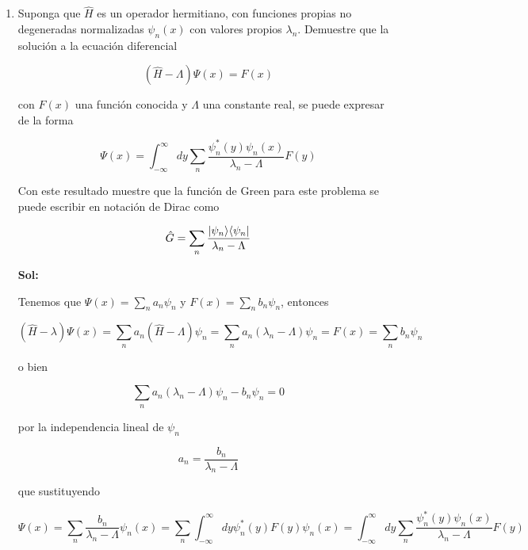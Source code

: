 \documentclass[12pt,a4paper]{article}
\DeclarePairedDelimiter\bra{\langle}{\rvert}
\DeclarePairedDelimiter\ket{\lvert}{\rangle}
\begin{document}
\begin{enumerate}



\item Suponga que $\hat{H}$ es un operador hermitiano, con funciones propias no degeneradas normalizadas $\psi_{n}(x)$ con valores propios $\lambda_n$. Demuestre que la solución a la ecuación diferencial

\begin{equation*}
    (\hat{H} - \Lambda) \Psi (x) = F(x)
\end{equation*}

con $F(x)$ una función conocida y $\Lambda$ una constante real, se puede expresar de la forma

\begin{equation*}
    \Psi (x) = \int_{-\infty}^{\infty} dy \sum_{n} \frac{\psi_{n}^{*}(y)\psi_{n}(x)}{\lambda_{n} - \Lambda} F(y)
\end{equation*}

Con este resultado muestre que la función de Green para este problema se puede escribir en notación de Dirac como

\begin{equation*}
    \hat{G} = \sum_{n} \frac{\ket{\psi_n}\bra{\psi_n}}{\lambda_n - \Lambda}
\end{equation*}

\textbf{Sol:}

Tenemos que $\Psi (x) = \sum_{n} a_n \psi_{n} $ y $F(x) = \sum_{n} b_{n} \psi_{n}$, entonces

\begin{equation*}
    (\hat{H} - \lambda) \Psi (x) = \sum_{n} a_n (\hat{H}- \Lambda) \psi_{n} = \sum_{n} a_{n} (\lambda_{n} - \Lambda) \psi_{n} = F(x) = \sum_{n} b_{n} \psi_{n}
\end{equation*}

o bien

\begin{equation*}
    \sum_{n} a_{n} (\lambda_{n} - \Lambda) \psi_{n} - b_{n} \psi_{n} = 0
\end{equation*}

por la independencia lineal de $\psi_{n}$

\begin{equation*}
    a_{n} = \frac{b_{n}}{\lambda_{n} - \Lambda}
\end{equation*}

que sustituyendo

\begin{equation*}
    \Psi (x) = \sum_{n} \frac{b_{n}}{\lambda_n - \Lambda} \psi_n (x) = \sum_{n} \int_{-\infty}^{\infty} dy \psi_{n}^{*} (y) F(y) \psi_{n} (x) = \int_{-\infty}^{\infty} dy  \sum_{n} \frac{\psi_{n}^{*}(y)\psi_{n} (x)}{\lambda_{n} - \Lambda} F(y)
\end{equation*}


\end{enumerate}
\end{document}
